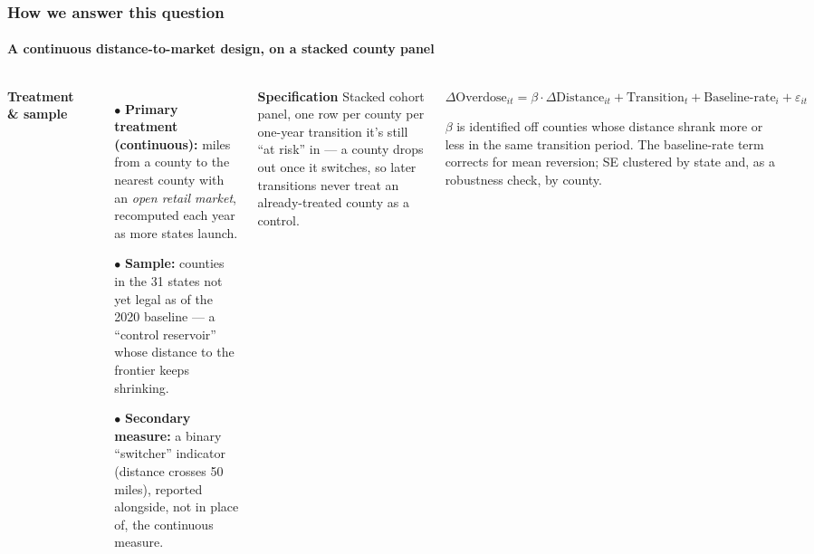 \documentclass[aspectratio=169,11pt]{beamer}
\begin{document}
\begin{frame}
\frametitle{How we answer this question}
\framesubtitle{A continuous distance-to-market design, on a stacked county panel}

\begin{columns}[t,totalwidth=\textwidth]

{\small\bfseries Treatment \& sample}
\vspace{0.2cm}
\begin{itemize}
\small
\item[\textcolor{accent}{$\bullet$}] \textbf{Primary treatment (continuous):} miles from a county to the nearest county with an \emph{open retail market}, recomputed each year as more states launch.
\item[\textcolor{accent}{$\bullet$}] \textbf{Sample:} counties in the 31 states not yet legal as of the 2020 baseline --- a ``control reservoir'' whose distance to the frontier keeps shrinking.
\item[\textcolor{accent}{$\bullet$}] \textbf{Secondary measure:} a binary ``switcher'' indicator (distance crosses 50 miles), reported alongside, not in place of, the continuous measure.
\end{itemize}

{\small\bfseries Specification}
\vspace{0.2cm}
\small Stacked cohort panel, one row per county per one-year transition it's still ``at risk'' in --- a county drops out once it switches, so later transitions never treat an already-treated county as a control.

\vspace{0.35cm}
\begin{block}{}
\small
$\Delta\text{Overdose}_{it} = \beta\cdot\Delta\text{Distance}_{it} + \text{Transition}_t + \text{Baseline-rate}_i + \varepsilon_{it}$

\vspace{0.15cm}
\scriptsize\color{inksoft} $\beta$ is identified off counties whose distance shrank more or less in the same transition period. The baseline-rate term corrects for mean reversion; SE clustered by state and, as a robustness check, by county.
\end{block}

\end{columns}
\end{frame}
\end{document}
